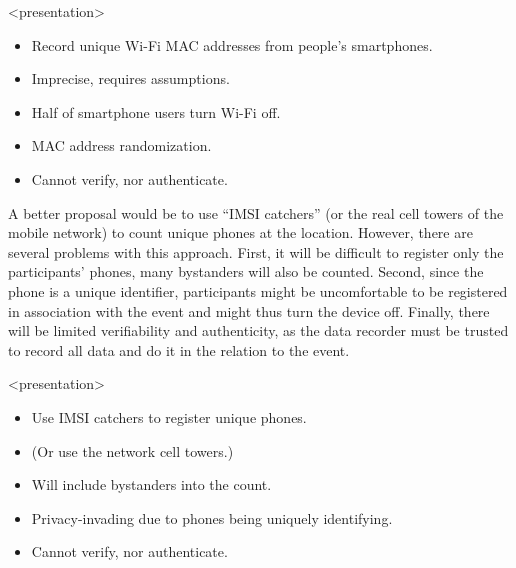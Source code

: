 \begin{frame}<presentation>
  \begin{solution}[Wi-Fi tracking]
    \begin{itemize}
      \item Record unique Wi-Fi MAC addresses from people's smartphones.
    \end{itemize}
  \end{solution}

  \pause

  \begin{remark}
    \begin{itemize}
      \item Imprecise, requires assumptions.
      \item Half of smartphone users turn Wi-Fi off.
      \item MAC address randomization.
      \item Cannot verify, nor authenticate.
    \end{itemize}
  \end{remark}
\end{frame}

A better proposal would be to use \enquote{IMSI catchers} (or the real cell 
towers of the mobile network) to count unique phones at the location.
However, there are several problems with this approach.
First, it will be difficult to register only the participants' phones, many 
bystanders will also be counted.
Second, since the phone is a unique identifier, participants might be 
uncomfortable to be registered in association with the event and might thus 
turn the device off.
Finally, there will be limited verifiability and authenticity, as the data 
recorder must be trusted to record all data and do it in the relation to the 
event.

\begin{frame}<presentation>
  \begin{solution}
    \begin{itemize}
      \item Use IMSI catchers to register unique phones.
      \item (Or use the network cell towers.)
    \end{itemize}
  \end{solution}

  \pause

  \begin{remark}
    \begin{itemize}
      \item Will include bystanders into the count.
      \item Privacy-invading due to phones being uniquely identifying.
      \item Cannot verify, nor authenticate.
    \end{itemize}
  \end{remark}
\end{frame}


